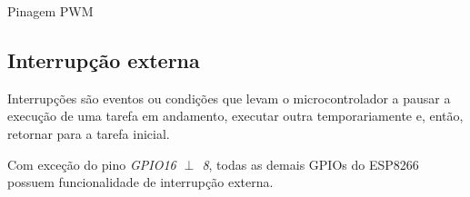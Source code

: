 \documentclass[
12pt,				%
openany,			%
twoside,			%
a4paper,			%
english,			%
french,				%
spanish,			%
brazil,				%
]{abntex2}
\begin{document}
\begin{table}[ht]
    \centering
    \caption{Pinagem PWM \label{PWM-table}}
\end{table}     

\subsection{Interrupção externa}
Interrupções são eventos ou condições que levam o microcontrolador a pausar a execução de uma tarefa em andamento, executar outra temporariamente e, então, retornar para a tarefa inicial.

Com exceção do pino \emph{GPIO16 $\perp$ 8}, todas as demais GPIOs do ESP8266 possuem funcionalidade de interrupção externa.

\vspace{10pt}
\end{document}
